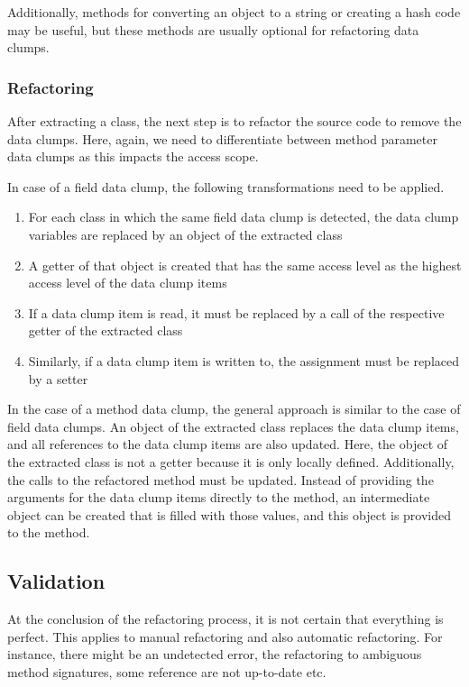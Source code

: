 Additionally, methods for converting an object to a string or creating a hash code may be useful, but these methods are usually optional for refactoring data clumps. 


\subsubsection{Refactoring}
After extracting a class, the next step is to refactor the source code to remove the data clumps. Here, again, we need to differentiate between method parameter data clumps as this impacts the access scope. 

In case of a field data clump, the following transformations need to be applied.

\begin{enumerate}
    \item For each class in which the same field data clump is detected, the data clump variables are replaced by an object of the extracted class
    \item A getter of that object is created that has the same access level as the highest access level of the data clump items
    \item If a data clump item is read, it must be replaced by a call of the respective getter of the extracted class
    \item Similarly, if a data clump item is written to, the assignment must be replaced by a setter
\end{enumerate}



In the case of a method data clump, the general approach is similar to the case of field data clumps. An object of the extracted class replaces the data clump items, and all references to the data clump items are also updated. Here, the object of the extracted class is not a getter because it is only locally defined. Additionally, the calls to the refactored method must be updated. Instead of providing the arguments for the data clump items directly to the method, an intermediate object can be created that is filled with those values, and this object is provided to the method. 

\subsection{Validation}

At the conclusion of the refactoring process, it is not certain that everything is perfect. This applies to manual refactoring and also automatic refactoring. For instance, there might be an undetected error, the refactoring to ambiguous method signatures, some reference are not up-to-date etc.

